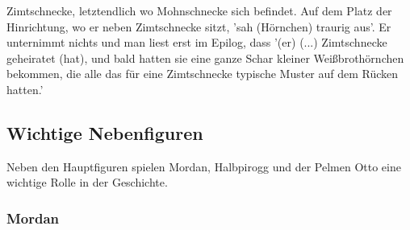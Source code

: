 Zimtschnecke, letztendlich wo Mohnschnecke sich befindet.\cite[S.599]{pir} Auf dem Platz der Hinrichtung, wo er neben Zimtschnecke sitzt, \cite[S.609]{pir} 'sah (Hörnchen) traurig aus'.\cite[S.609]{pir} Er unternimmt nichts und man liest erst im Epilog, dass '(er) (...) Zimtschnecke geheiratet (hat), und bald hatten sie eine ganze Schar kleiner Weißbrothörnchen bekommen, die alle das für eine Zimtschnecke typische Muster auf dem Rücken hatten.'\cite[S.644]{pir}

\subsection{Wichtige Nebenfiguren}
Neben den Hauptfiguren spielen Mordan, Halbpirogg und der Pelmen Otto eine wichtige Rolle in der Geschichte.

\subsubsection{Mordan}
